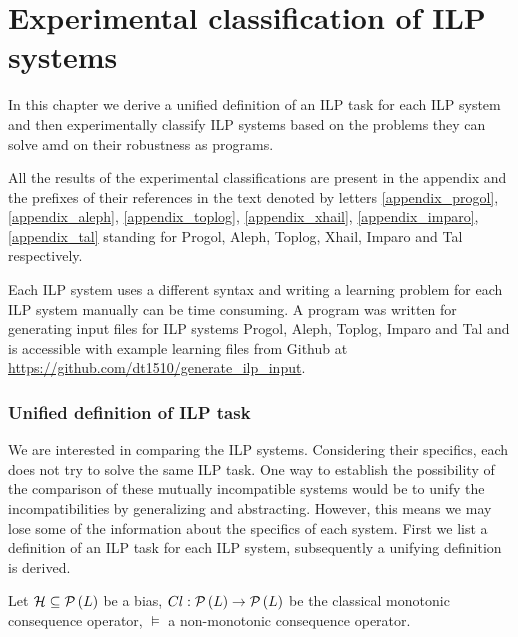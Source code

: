 \chapter{Experimental classification of ILP systems}\label{chap:classification_of_ilp_systems}
In this chapter we derive a unified definition of an ILP task for each ILP system and then experimentally classify ILP systems based on the problems they can solve amd on their robustness as programs.

All the results of the experimental classifications are present in the appendix and the prefixes of their references in the text denoted by letters
\ref{appendix_progol}, \ref{appendix_aleph}, \ref{appendix_toplog}, \ref{appendix_xhail}, \ref{appendix_imparo}, \ref{appendix_tal} standing for
Progol, Aleph, Toplog, Xhail, Imparo and Tal respectively.

Each ILP system uses a different syntax and writing a learning problem for each ILP system manually can be time consuming. A program  was written  for generating input files for ILP systems Progol, Aleph, Toplog, Imparo and Tal and is accessible with example learning files from Github at 
\url{https://github.com/dt1510/generate_ilp_input}.

\subsection{Unified definition of ILP task}
We are interested in comparing the ILP systems. Considering their specifics, each does not try to solve the same ILP task. One way to establish the possibility of the comparison of these mutually incompatible systems would be to unify the incompatibilities by generalizing and abstracting. However, this means we may lose some of the information about the specifics of each system. First we list a definition of an ILP task for each ILP system, subsequently a unifying definition is derived.

Let $\mathcal{H} \subseteq \mathcal{P} \left({ L }\right)$ be a bias, $Cl:\mathcal{P} \left({ L }\right) \to \mathcal{P} \left({ L }\right)$ be the classical monotonic consequence operator, $\models$ a non-monotonic consequence operator.


